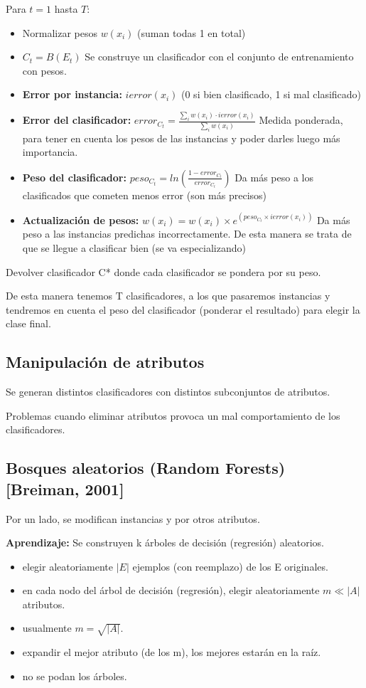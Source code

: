 \documentclass[12pt, twoside, openright]{report} %
\begin{document}
Para $t = 1$ hasta $T$:
\begin{itemize}
  \item Normalizar pesos $w(x_i)$ (suman todas 1 en total)
  \item $C_t = B(E_t)$ Se construye un clasificador con el conjunto de entrenamiento con pesos.
  \item \textbf{Error por instancia:} $ierror(x_i)$ (0 si bien clasificado, 1 si mal clasificado)
  \item \textbf{Error del clasificador:} $error_{C_t} = \frac {\sum_i w(x_i)\cdot ierror(x_i)} {\sum_i w(x_i)}$ Medida ponderada, para tener en cuenta los pesos de las instancias y poder darles luego más importancia.
  \item \textbf{Peso del clasificador:} $peso_{C_t} = ln \left( \frac{1-error_{C_t}}{error_{C_t}} \right)$ Da más peso a los clasificados que cometen menos error (son más precisos)
  \item \textbf{Actualización de pesos:} $w(x_i) = w(x_i) \times e^{(peso_{C_t} \times ierror(x_i))}$ Da más peso a las instancias predichas incorrectamente. De esta manera se trata de que se llegue a clasificar bien (se va especializando)
\end{itemize}
Devolver clasificador C* donde cada clasificador se pondera por su peso.

De esta manera tenemos T clasificadores, a los que pasaremos instancias y tendremos en cuenta el peso del clasificador (ponderar el resultado) para elegir la clase final.

\subsection{Manipulación de atributos}
Se generan distintos clasificadores con distintos subconjuntos de atributos.

Problemas cuando eliminar atributos provoca un mal comportamiento de los clasificadores.

\subsection{Bosques aleatorios (Random Forests) [Breiman, 2001]}
Por un lado, se modifican instancias y por otros atributos.

\textbf{Aprendizaje:} Se construyen k árboles de decisión (regresión) aleatorios.
\begin{itemize}
  \item elegir aleatoriamente $|E|$ ejemplos (con reemplazo) de los E originales.
  \item en cada nodo del árbol de decisión (regresión), elegir aleatoriamente $m \ll |A|$ atributos.
  \item usualmente $m = \sqrt{|A|}$.
  \item expandir el mejor atributo (de los m), los mejores estarán en la raíz.
  \item no se podan los árboles.
\end{itemize}
\end{document}

